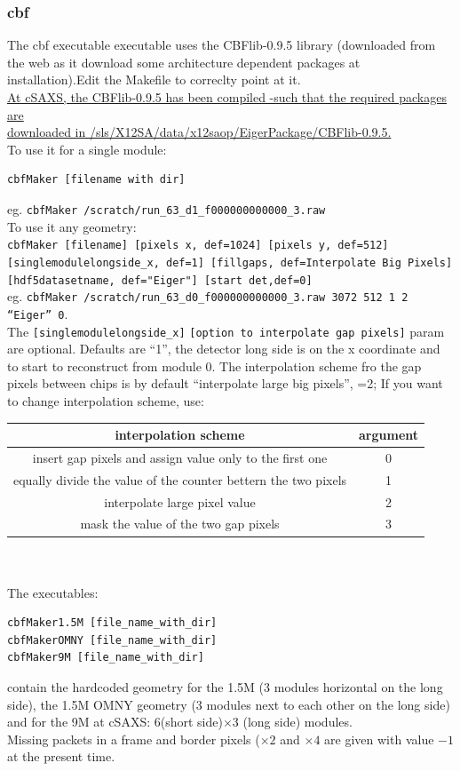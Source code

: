 \documentclass{article}
\begin{document}
\subsubsection{cbf}
The cbf executable executable uses the CBFlib-0.9.5 library (downloaded from the web as it download some architecture dependent packages at installation).Edit the Makefile to correclty point at it.\\
\underline{At cSAXS, the CBFlib-0.9.5 has been compiled -such that the required packages are}\\\underline{ downloaded in /sls/X12SA/data/x12saop/EigerPackage/CBFlib-0.9.5.}\\ 

To use it for a single module:
\begin{verbatim}
cbfMaker [filename with dir]
\end{verbatim}
eg.
{\tt{cbfMaker /scratch/run\_63\_d1\_f000000000000\_3.raw}}\\

To use it any geometry:\\
{\tt{cbfMaker [filename] [pixels x, def=1024] [pixels y, def=512] [singlemodulelongside\_x, def=1] [fillgaps, def=Interpolate Big Pixels] [hdf5datasetname, def="Eiger"] [start det,def=0]}}\\
eg.
{\tt cbfMaker /scratch/run\_63\_d0\_f000000000000\_3.raw  3072 512 1 2 ``Eiger'' 0}.\\

The {\tt{[singlemodulelongside\_x]}} {\tt{[option to interpolate gap pixels]}} param are optional. Defaults are ``1'', the detector long side is on the x coordinate and to start to reconstruct from module 0.
The interpolation scheme fro the gap pixels between chips is by default ``interpolate large big pixels'', =2;
If you want to change interpolation scheme, use:\\
\begin{tabular}{|c|c|}
\hline
interpolation scheme & argument\\
\hline
insert gap pixels and assign value only to the first one  & 0\\
\hline
equally divide the value of the counter bettern the two pixels & 1\\
\hline
interpolate large pixel value & 2\\
\hline
mask the value of the two gap pixels & 3\\
\hline
\end{tabular}
\ \\
\ \\ 
The executables: 
\begin{verbatim}
cbfMaker1.5M [file_name_with_dir]
cbfMakerOMNY [file_name_with_dir]
cbfMaker9M [file_name_with_dir]
\end{verbatim}
contain the hardcoded geometry for the 1.5M (3 modules horizontal on the long side), the 1.5M OMNY geometry (3 modules next to each other on the long side) and for the 9M at cSAXS: 6(short side)$\times$3 (long side) modules.\\ 
Missing packets in a frame and border pixels ($\times 2$ and $\times 4$ are given with value $-1$ at the present time.
\end{document}
